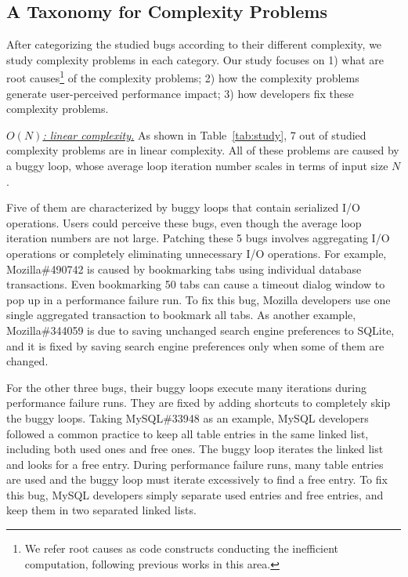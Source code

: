 \subsection{A Taxonomy for Complexity Problems}
\label{sec:tax}







After categorizing the studied bugs according to their different complexity, 
we study complexity problems in each category.
Our study focuses on 
1) what are root causes\footnote{We refer root causes as code constructs 
conducting the inefficient computation, 
following previous works in this area\cite{SongOOPSLA2014,ldoctor}.} 
of the complexity problems;
2) how the complexity problems generate user-perceived performance impact;
3) how developers fix these complexity problems. 

{\underline{\textit{$O(N)$: linear complexity.}}} 
As shown in Table~\ref{tab:study}, 
7 out of \ComBugs studied complexity problems are in linear complexity. 
All of these problems are caused by a buggy loop, 
whose average loop iteration number scales in terms of input size $N$.

Five of them are characterized by buggy loops that contain serialized I/O operations.
Users could perceive these bugs, 
even though the average loop iteration numbers are not large.
Patching these 5 bugs involves aggregating I/O operations 
or completely eliminating unnecessary I/O operations. 
For example, Mozilla\#490742 is caused by bookmarking 
tabs using individual database transactions. 
Even bookmarking 50 tabs can cause a timeout dialog 
window to pop up in a performance failure run. 
To fix this bug, Mozilla developers use one single aggregated transaction 
to bookmark all tabs.
As another example, Mozilla\#344059 is due to saving unchanged 
search engine preferences to SQLite, 
and it is fixed by saving search 
engine preferences only when some of them are changed.

For the other three bugs,
their buggy loops execute many iterations during performance failure runs.
They are fixed by adding shortcuts to completely skip the buggy loops. 
Taking MySQL\#33948 as an example,
MySQL developers followed a common practice to keep all table entries in the same linked list, 
including both used ones and free ones. 
The buggy loop iterates the linked list and looks for a free entry.
During performance failure runs, 
many table entries are used and the buggy loop must iterate excessively to find a free entry.
To fix this bug, MySQL developers simply separate used entries and free entries,
and keep them in two separated linked lists. 

